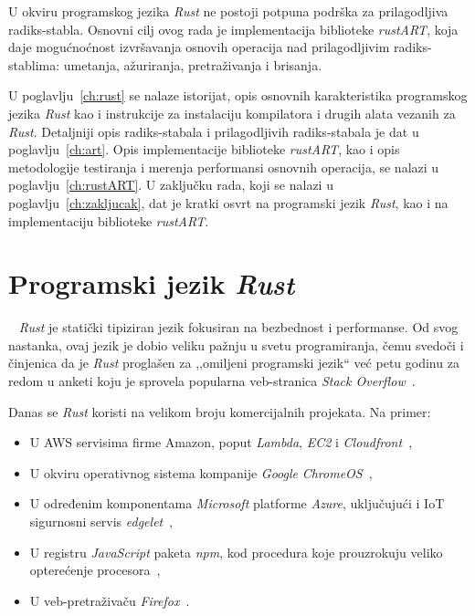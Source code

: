 \documentclass[12pt,oneside]{memoir}
\begin{document}
U okviru programskog jezika \textit{Rust} ne postoji potpuna podrška za
prilagodljiva radiks-stabla. Osnovni cilj ovog rada je implementacija
biblioteke \textit{rustART}, koja daje mogućnoćnost izvršavanja osnovih operacija
nad prilagodljivim radiks-stablima: umetanja, ažuriranja, pretraživanja i brisanja.

U poglavlju~\ref{ch:rust} se nalaze istorijat, opis
osnovnih karakteristika programskog jezika \textit{Rust} kao i instrukcije
za instalaciju kompilatora i drugih alata vezanih za \textit{Rust}.
Detaljniji opis radiks-stabala i
prilagodljivih radiks-stabala je dat u poglavlju~\ref{ch:art}.
Opis implementacije biblioteke \textit{rustART}, kao i opis metodologije
testiranja i merenja performansi osnovnih operacija,
se nalazi u poglavlju~\ref{ch:rustART}.
U zaključku rada, koji se nalazi u poglavlju~\ref{ch:zakljucak}, dat
je kratki osvrt na programski jezik \textit{Rust}, kao i na implementaciju
biblioteke \textit{rustART}.

\chapter{Programski jezik \emph{Rust}}~\label{ch:rust}
\emph{Rust} je statički tipiziran jezik  fokusiran na bezbednost i
performanse. Od svog nastanka, ovaj jezik
je dobio veliku pažnju u svetu programiranja, čemu svedoči i činjenica da je
\emph{Rust} proglašen za ,,omiljeni programski jezik`` već petu godinu za redom
u anketi koju je sprovela popularna veb-stranica \emph{Stack Overflow}~\cite{mostloved_so}.

Danas se \emph{Rust} koristi na velikom broju komercijalnih projekata. Na primer:

\begin{itemize}
    \item U AWS servisima firme Amazon, poput \emph{Lambda}, \emph{EC2}
        i \emph{Cloudfront}~\cite{aws},
    \item U okviru operativnog sistema kompanije \textit{Google}
        \emph{ChromeOS}~\cite{crosvm},
    \item U određenim komponentama \textit{Microsoft} platforme \emph{Azure}, uključujući i
        IoT sigurnosni servis \emph{edgelet}~\cite{edgelet},
    \item U registru \emph{JavaScript} paketa \emph{npm},
        kod procedura koje prouzrokuju veliko opterećenje procesora~\cite{npm},
    \item U veb-pretraživaču \textit{Firefox}~\cite{firefox_rust}.
\end{itemize}
\end{document}
